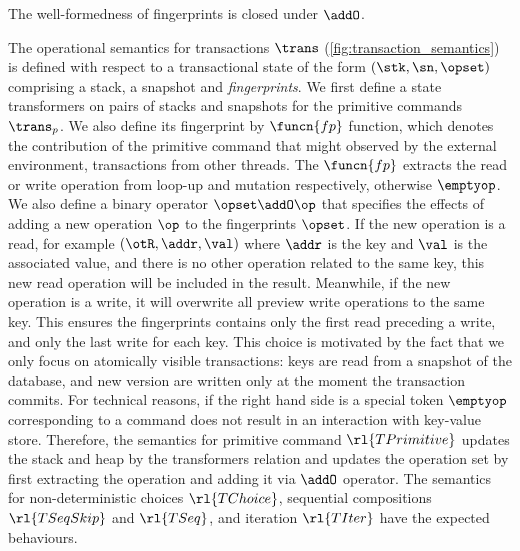 \begin{lemma}
The well-formedness of fingerprints is closed under \( \addO \).
\end{lemma}

The operational semantics for transactions \(\trans\) (\cref{fig:transaction_semantics}) is defined with respect to a transactional state of the form \((\stk, \sn, \opset)\) comprising a stack, a snapshot and \emph{fingerprints}.
We first define a state transformers on pairs of stacks and snapshots for the primitive commands \(\trans_{p}\).
We also define its fingerprint by \( \funcn{fp} \) function, which denotes the contribution of the primitive command that might observed by the external environment, \ie transactions from other threads.
The \( \funcn{fp} \) extracts the read or write operation from loop-up and mutation respectively, otherwise \( \emptyop \).
We also define a binary operator \( \opset \addO \op \) that specifies the effects of adding a new operation \( \op \) to the fingerprints \( \opset \).
If the new operation is a read, for example \((\otR, \addr, \val)\) where \( \addr \) is the key and \( \val\) is the associated value, and there is no other operation related to the same key, this new read operation will be included in the result.
Meanwhile, if the new operation is a write, it will overwrite all preview write operations to the same key.
This ensures the fingerprints contains only the first read preceding a write, and only the last write for each key.
This choice is motivated by the fact that we only focus on atomically visible transactions: keys are read from a snapshot of the database, and new version are written only at the moment the transaction commits.
For technical reasons, if the right hand side is a special token \( \emptyop \) corresponding to a command does not result in an interaction with key-value store.
Therefore, the semantics for primitive command \(\rl{TPrimitive}\) updates the stack and heap by the transformers relation and updates the operation set by first extracting the operation and adding it via \( \addO \) operator.
The semantics for non-deterministic choices \(\rl{TChoice}\), sequential compositions \(\rl{TSeqSkip}\) and \(\rl{TSeq}\), and iteration \(\rl{TIter}\) have the expected behaviours.

